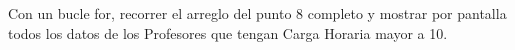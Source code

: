 
Con un bucle for, recorrer el arreglo del punto 8 completo y mostrar por pantalla todos los datos de los Profesores que tengan Carga Horaria mayor a 10.



\volverindice
\newpage